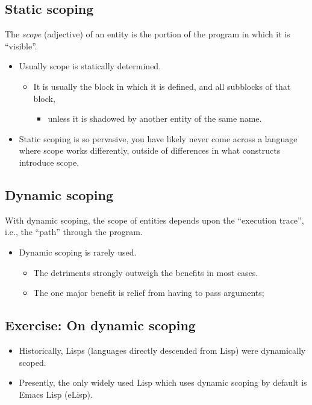 \documentclass[11pt]{article}
\theoremstyle{definition}
\begin{document}
\subsection{Static scoping}
\label{sec:org4cfa56d}

The \emph{scope} (adjective) of an entity is the portion of the program
in which it is “visible”.
\begin{itemize}
\item Usually scope is statically determined.
\begin{itemize}
\item It is usually the block in which it is defined,
and all subblocks of that block,
\begin{itemize}
\item unless it is shadowed by another entity of the same name.
\end{itemize}
\end{itemize}
\item Static scoping is so pervasive, you have likely
never come across a language where scope works differently,
outside of differences in what constructs introduce scope.
\end{itemize}

\subsection{Dynamic scoping}
\label{sec:org34dc550}

With dynamic scoping, the scope of entities depends upon the
    “execution trace”, i.e., the “path” through the program.
\begin{itemize}
\item Dynamic scoping is rarely used.
\begin{itemize}
\item The detriments strongly outweigh the benefits in most cases.
\item The one major benefit is relief from having to pass arguments;
\end{itemize}
\end{itemize}

\subsection{Exercise: On dynamic scoping}
\label{sec:orgb204887}

\begin{itemize}
\item Historically, Lisps (languages directly descended from Lisp)
were dynamically scoped.
\item Presently, the only widely used Lisp which uses dynamic scoping
by default is Emacs Lisp (eLisp).
\end{itemize}
\end{document}

